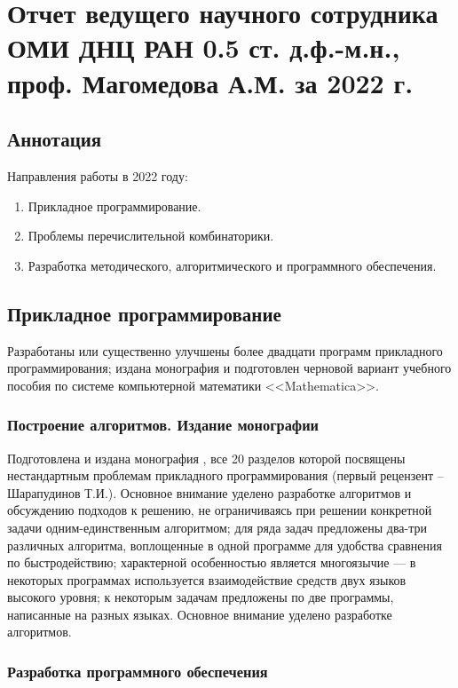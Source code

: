 \chapter{Отчет ведущего научного сотрудника ОМИ ДНЦ РАН 0.5 ст. д.ф.-м.н., проф. Магомедова А.М. за 2022 г.}


\section*{Аннотация}

Направления работы в 2022 году:

\begin{enumerate}
    \item Прикладное программирование. 
    \item Проблемы перечислительной комбинаторики.
    \item Разработка методического, алгоритмического и программного обеспечения.
\end{enumerate}


\section{Прикладное программирование}

Разработаны или существенно улучшены более двадцати программ прикладного программирования; издана монография и подготовлен черновой вариант  учебного пособия по системе компьютерной математики <<Mathematica>>.


\subsection{Построение алгоритмов. Издание монографии}

Подготовлена и издана монография \cite{akm-bib-m1}, все 20 разделов которой посвящены нестандартным проблемам прикладного программирования (первый рецензент -- Шарапудинов Т.И.).   
Основное внимание уделено разработке алгоритмов и обсуждению подходов к решению, не ограничиваясь при решении конкретной задачи одним-единственным алгоритмом; для ряда задач предложены два-три различных алгоритма, воплощенные в одной программе для удобства сравнения по быстродействию; характерной особенностью является многоязычие --- в некоторых программах используется взаимодействие средств двух языков высокого уровня; к некоторым задачам предложены по две программы, написанные на разных языках.
Основное внимание уделено разработке алгоритмов.


\subsection{Разработка программного обеспечения} 

